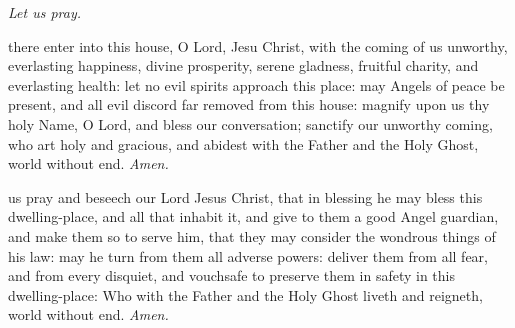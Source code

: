 


\par\noindent
\centerline{\textit{Let us pray.}}

 there enter into this house, O Lord, Jesu Christ, with the coming of us unworthy, everlasting happiness, divine prosperity, serene gladness, fruitful charity, and everlasting health: let no evil spirits approach this place: may Angels of peace be present, and all evil discord far removed from this house: magnify upon us thy holy Name, O Lord, and {} bless our conversation; sanctify our unworthy coming, who art holy and gracious, and abidest with the Father and the Holy Ghost, world without end. \textit{Amen.}\par
{} us pray and beseech our Lord Jesus Christ, that in blessing he may {} bless this dwelling-place, and all that inhabit it, and give to them a good Angel guardian, and make them so to serve him, that they may consider the wondrous things of his law: may he turn from them all adverse powers: deliver them from all fear, and from every disquiet, and vouchsafe to preserve them in safety in this dwelling-place: Who with the Father and the Holy Ghost liveth and reigneth, world without end. \textit{Amen.}

